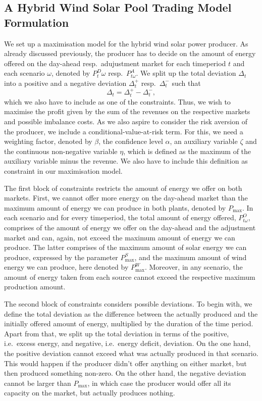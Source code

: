 \subsection{ A Hybrid Wind Solar Pool Trading Model Formulation}
We set up a maximisation model for the hybrid wind solar power producer. As already discussed previously, the producer has to decide on the amount of energy offered on the day-ahead resp.\ adujustment market for each timeperiod $t$ and each scenario $\omega$, denoted by $P^{D}_t{\omega}$ resp.\ $P^{A}_{t \omega}$. We split up the total deviation $\Delta_{t}$ into a positive and a negative deviation $\Delta_{t}^{+}$ resp.\ $\Delta_{t}^{-}$ such that
\begin{equation*}
	\Delta_{t}=\Delta_{t}^{+}-\Delta_{t}^{-},
\end{equation*}
which we also have to include as one of the constraints. Thus, we wish to maximise the profit given by the sum of the revenues on the respective markets and possible imbalance costs. As we also aspire to consider the risk aversion of the producer, we include a conditional-value-at-risk term. For this, we need a weighting factor, denoted by $\beta$, the confidence level $\alpha$, an auxiliary variable $\zeta$ and the continuous non-negative variable $\eta$, which is defined as the maximum of the auxiliary variable minus the revenue. We also have to include this definition as constraint in our maximisation model. 

The first block of constraints restricts the amount of energy we offer on both markets. First, we cannot offer more energy on the day-ahead market than the maximum amount of energy we can produce in both plants, denoted by $P_{\max}$. In each scenario and for every timeperiod, the total amount of energy offered, $P^{O}_{t \omega}$, comprises of the amount of energy we offer on the day-ahead and the adjustment market and can, again, not exceed the maximum amount of energy we can produce. The latter comprises of the maximum amount of solar energy we can produce, expressed by the parameter $P_{\max}^{S}$, and the maximum amount of wind energy we can produce, here denoted by $P_{\max}^{W}$. Moreover, in any scenario, the amount of energy taken from each source cannot exceed the respective maximum production amount. 

The second block of constraints considers possible deviations. To begin with, we define the total deviation as the difference between the actually produced and the initially offered amount of energy, multiplied by the duration of the time period. Apart from that, we split up the total deviation in terms of the positive, i.e.\ excess energy, and negative, i.e.\ energy deficit, deviation. On the one hand, the positive deviation cannot exceed what was actually produced in that scenario. This would happen if the producer didn't offer anything on either market, but then produced something non-zero. On the other hand, the negative deviation cannot be larger than $P_{\max}$, in which case the producer would offer all its capacity on the market, but actually produces nothing. 

